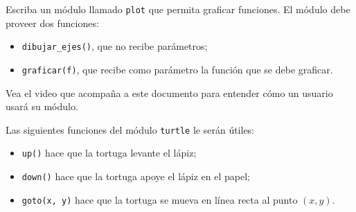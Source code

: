 Escriba un módulo llamado \verb!plot!
que permita graficar funciones.
El módulo debe proveer dos funciones:
\begin{itemize}
  \item
    \verb!dibujar_ejes()!, que no recibe parámetros;
  \item
    \verb!graficar(f)!, que recibe como parámetro
    la función que se debe graficar.
\end{itemize}

Vea el video que acompaña a este documento
para entender cómo un usuario usará su módulo.

Las siguientes funciones del módulo \verb!turtle!
le serán útiles:
\begin{itemize}
  \item
    \verb!up()!
    hace que la tortuga levante el lápiz;
  \item
    \verb!down()! hace que la tortuga
    apoye el lápiz en el papel;
  \item
    \verb!goto(x, y)! hace que la tortuga
    se mueva en línea recta al punto \((x, y)\).
\end{itemize}


